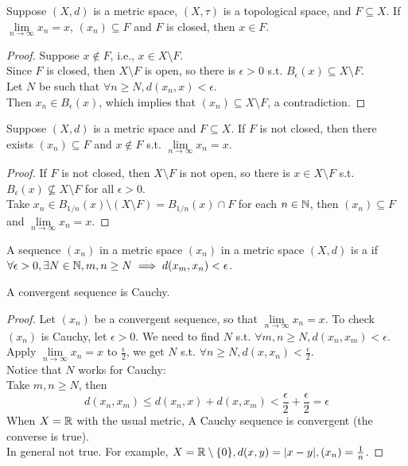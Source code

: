 \documentclass[11pt]{article}
\begin{document}
\proposition Suppose $(X, d)$ is a metric space, $(X, \tau)$ is a topological space, and $F \subseteq X$. If $\underset{n \rightarrow \infty}{\lim} x_n = x$, $(x_n) \subseteq F$ and $F$ is closed, then $x \in F$.
\begin{proof}
	Suppose $x \notin F$, i.e., $x \in X \setminus F$. \\
	Since $F$ is closed, then $X \setminus F$ is open, so there is $\epsilon > 0$ s.t. $B_\epsilon(x) \subseteq X \setminus F$. \\
	Let $N$ be such that $\forall n \geq N, d(x_n, x) < \epsilon$.\\
	 Then $x_n \in B_\epsilon(x)$, which implies that $(x_n) \subseteq X \setminus F$, a contradiction.
\end{proof}

\proposition Suppose $(X, d)$ is a metric space and $F \subseteq X$. If $F$ is not closed, then there exists $(x_n) \subseteq F$ and $x \notin F$ s.t. $\underset{n \rightarrow \infty}{\lim} x_n = x$.

\begin{proof}
	If $F$ is not closed, then $X \setminus F$ is not open, so there is $x \in X \setminus F$ s.t. $B_\epsilon(x) \not \subseteq X \setminus F$ for all $\epsilon > 0$. \\
	Take $x_n \in B_{1/n}(x) \setminus (X \setminus F)= B_{1/n}(x) \cap F$ for each $n \in \mathbb{N}$, then $(x_n) \subseteq F$ and $\underset{n \rightarrow \infty}{\lim} x_n = x$.
\end{proof}

 A sequence $(x_n)$ in a metric space $(x_n)$ in a metric space $(X, d)$ is a  if $\forall \epsilon >0, \exists N \in \mathbb{N}, m, n \geq N \implies d(x_m, x_n) < \epsilon$.
 
\proposition
A convergent sequence is Cauchy. 
\begin{proof}
	Let $(x_n)$ be a convergent sequence, so that $\underset{n \rightarrow \infty}{\lim} x_n = x$. To check $(x_n)$ is Cauchy, let $\epsilon > 0$. We need to find $N$ s.t. $\forall m, n \geq N, d(x_n, x_m) < \epsilon$.\\
	Apply $\underset{n \rightarrow \infty}{\lim} x_n = x$ to $\frac{\epsilon}{2}$, we get $N$ s.t. $\forall n \geq N, d(x, x_n) < \frac{\epsilon}{2}$. \\
	Notice that $N$ works for Cauchy: \\
	Take $m, n \geq N$, then $$d(x_n, x_m) \leq d(x_n, x) + d(x, x_m) < \frac{\epsilon}{2} + \frac{\epsilon}{2} = \epsilon$$
\remark
When $X = \mathbb{R}$ with the usual metric, A Cauchy sequence is convergent (the converse is true). \\
In general not true. For example, $X = \mathbb{R} \setminus \{0\}, d(x,y) = |x - y|, (x_n) = \frac{1}{n}$.

\end{proof}
\end{document}
